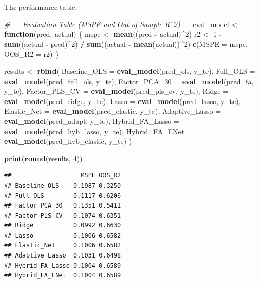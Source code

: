 \documentclass[
]{article}
\newenvironment{Shaded}{\begin{snugshade}}{\end{snugshade}}
\newcommand{\AttributeTok}[1]{\textcolor[rgb]{0.13,0.29,0.53}{#1}}
\newcommand{\CommentTok}[1]{\textcolor[rgb]{0.56,0.35,0.01}{\textit{#1}}}
\newcommand{\ControlFlowTok}[1]{\textcolor[rgb]{0.13,0.29,0.53}{\textbf{#1}}}
\newcommand{\DecValTok}[1]{\textcolor[rgb]{0.00,0.00,0.81}{#1}}
\newcommand{\FunctionTok}[1]{\textcolor[rgb]{0.13,0.29,0.53}{\textbf{#1}}}
\newcommand{\NormalTok}[1]{#1}
\newcommand{\OtherTok}[1]{\textcolor[rgb]{0.56,0.35,0.01}{#1}}
\newcommand{\SpecialCharTok}[1]{\textcolor[rgb]{0.81,0.36,0.00}{\textbf{#1}}}
\begin{document}
The performance table.

\begin{Shaded}
\begin{Highlighting}[]
\CommentTok{\# {-}{-}{-} Evaluation Table (MSPE and Out{-}of{-}Sample R\^{}2) {-}{-}{-}}
\NormalTok{eval\_model }\OtherTok{\textless{}{-}} \ControlFlowTok{function}\NormalTok{(pred, actual) \{}
\NormalTok{  mspe }\OtherTok{\textless{}{-}} \FunctionTok{mean}\NormalTok{((pred }\SpecialCharTok{{-}}\NormalTok{ actual)}\SpecialCharTok{\^{}}\DecValTok{2}\NormalTok{)}
\NormalTok{  r2   }\OtherTok{\textless{}{-}} \DecValTok{1} \SpecialCharTok{{-}} \FunctionTok{sum}\NormalTok{((actual }\SpecialCharTok{{-}}\NormalTok{ pred)}\SpecialCharTok{\^{}}\DecValTok{2}\NormalTok{) }\SpecialCharTok{/} \FunctionTok{sum}\NormalTok{((actual }\SpecialCharTok{{-}} \FunctionTok{mean}\NormalTok{(actual))}\SpecialCharTok{\^{}}\DecValTok{2}\NormalTok{)}
  \FunctionTok{c}\NormalTok{(}\AttributeTok{MSPE =}\NormalTok{ mspe, }\AttributeTok{OOS\_R2 =}\NormalTok{ r2)}
\NormalTok{\}}

\NormalTok{results }\OtherTok{\textless{}{-}} \FunctionTok{rbind}\NormalTok{(}
  \AttributeTok{Baseline\_OLS     =} \FunctionTok{eval\_model}\NormalTok{(pred\_ols,         y\_te),}
  \AttributeTok{Full\_OLS         =} \FunctionTok{eval\_model}\NormalTok{(pred\_full\_ols,    y\_te),}
  \AttributeTok{Factor\_PCA\_30    =} \FunctionTok{eval\_model}\NormalTok{(pred\_fa,          y\_te),}
  \AttributeTok{Factor\_PLS\_CV    =} \FunctionTok{eval\_model}\NormalTok{(pred\_pls\_cv,      y\_te),}
  \AttributeTok{Ridge            =} \FunctionTok{eval\_model}\NormalTok{(pred\_ridge,       y\_te),}
  \AttributeTok{Lasso            =} \FunctionTok{eval\_model}\NormalTok{(pred\_lasso,       y\_te),}
  \AttributeTok{Elastic\_Net      =} \FunctionTok{eval\_model}\NormalTok{(pred\_elastic,     y\_te),}
  \AttributeTok{Adaptive\_Lasso   =} \FunctionTok{eval\_model}\NormalTok{(pred\_adapt,       y\_te),}
  \AttributeTok{Hybrid\_FA\_Lasso  =} \FunctionTok{eval\_model}\NormalTok{(pred\_hyb\_lasso,   y\_te),}
  \AttributeTok{Hybrid\_FA\_ENet   =} \FunctionTok{eval\_model}\NormalTok{(pred\_hyb\_elastic, y\_te)}
\NormalTok{)}

\FunctionTok{print}\NormalTok{(}\FunctionTok{round}\NormalTok{(results, }\DecValTok{4}\NormalTok{))}
\end{Highlighting}
\end{Shaded}

\begin{verbatim}
##                   MSPE OOS_R2
## Baseline_OLS    0.1987 0.3250
## Full_OLS        0.1117 0.6206
## Factor_PCA_30   0.1351 0.5411
## Factor_PLS_CV   0.1074 0.6351
## Ridge           0.0992 0.6630
## Lasso           0.1006 0.6582
## Elastic_Net     0.1006 0.6582
## Adaptive_Lasso  0.1031 0.6498
## Hybrid_FA_Lasso 0.1004 0.6589
## Hybrid_FA_ENet  0.1004 0.6589
\end{verbatim}
\end{document}

